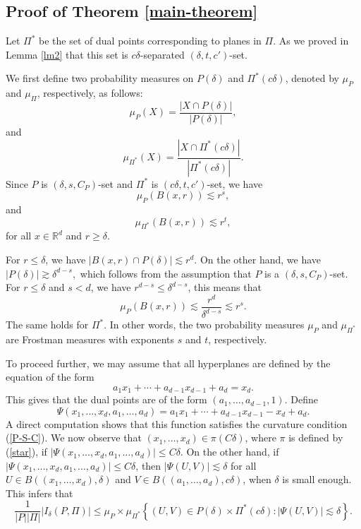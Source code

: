 \documentclass[11pt]{article}
\newcommand{\1}{\mathbf{1}}
\begin{document}
\subsection{Proof of Theorem \ref{main-theorem}}
Let $\Pi^*$ be the set of dual points corresponding to planes in $\Pi$. As we proved in Lemma \ref{lm2} that this set is $c\delta$-separated $(\delta, t, c')$-set.

We first define two probability measures on $P(\delta)$ and $\Pi^*(c\delta)$, denoted by $\mu_P$ and $\mu_{\Pi}$, respectively, as follows:
\[\mu_P(X)=\frac{ | X\cap P(\delta)|}{|P(\delta)|},\]
and
\[\mu_{\Pi^*}(X)=\frac{|X\cap \Pi^*(c\delta)|}{|\Pi^*(c\delta)|}.\]
Since $P$ is $(\delta, s, C_P)$-set and $\Pi^*$ is $(c\delta, t, c')$-set, we have
\[\mu_P(B(x, r)) \lesssim r^s,\]
and
\[\mu_{\Pi^*}(B(x, r))\lesssim r^{t},\]
for all $x\in \mathbb{R}^d$ and $r\ge \delta$.

For $r\le \delta$, we have $|B(x, r)\cap P(\delta)|\lesssim r^d$. On the other hand, we have $ |P(\delta)|\gtrsim \delta^{d-s},$
which follows from the assumption that $P$ is a $(\delta, s, C_P)$-set. For $r\le \delta$ and $s<d$, we have $r^{d-s}\le \delta^{d-s}$, this means that
\[\mu_P(B(x, r))\lesssim \frac{r^d}{\delta^{d-s}}\lesssim r^s.\]
The same holds for $\Pi^*$. In other words, the two probability measures $\mu_{P}$ and $\mu_{\Pi^*}$ are Frostman measures with exponents $s$ and $t$, respectively.

To proceed further, we may assume that all hyperplanes are defined by the equation of the form
\begin{equation}\label{star}a_1x_1+\cdots +a_{d-1}x_{d-1}+a_d=x_d.\end{equation}
This gives that the dual points are of the form $(a_1, \ldots, a_{d-1}, 1)$.
Define
\[\Psi(x_1, \ldots, x_d, a_1, \ldots, a_d)=a_1x_1+\cdots+a_{d-1}x_{d-1}-x_d+a_d.\]
A direct computation shows that this function satisfies the curvature condition (\ref{P-S-C}).
We now observe that $(x_1, \ldots, x_d)\in \pi(C\delta)$, where $\pi$ is defined by (\ref{star}), if $|\Psi(x_1, \ldots, x_d, a_1, \ldots, a_d)|\le C\delta$. On the other hand, if $|\Psi(x_1, \ldots, x_d, a_1, \ldots, a_d)|\le C\delta$, then $|\Psi(U,V)|\lesssim \delta$ for all $U\in B((x_1, \ldots, x_d), \delta)$ and $V\in B((a_1, \ldots, a_d), c\delta)$, when $\delta$ is small enough. This infers that
\[\frac{1}{|P||\Pi|}|I_{\delta}(P, \Pi)|\le \mu_P\times \mu_{\Pi^*}\left\lbrace (U, V)\in P(\delta)\times \Pi^*(c\delta) \colon |\Psi(U, V)|\lesssim \delta \right\rbrace.\]
\end{document}
